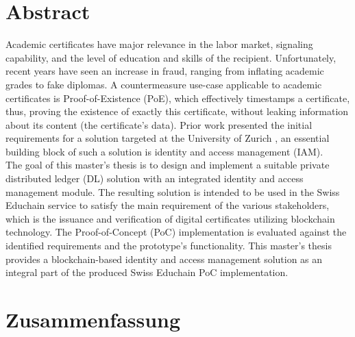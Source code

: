 \chapter*{Abstract}


Academic certificates have major relevance in the labor market, signaling capability, and the level of education and skills of the recipient. Unfortunately, recent years have seen an increase in fraud, ranging from inflating academic grades to fake diplomas. A countermeasure use-case applicable to academic certificates is Proof-of-Existence (PoE), which effectively timestamps a certificate, thus, proving the existence of exactly this certificate, without leaking information about its content (the certificate's data). Prior work presented the initial requirements for a solution targeted at the University of Zurich \cite{educhain-architecture}, an essential building block of such a solution is identity and access management (IAM). \\
The goal of this master's thesis is to design and implement a suitable private distributed ledger (DL) solution with an integrated identity and access management module. The resulting solution is intended to be used in the Swiss Educhain service \cite{educhain-proposal} to satisfy the main requirement of the various stakeholders, which is the issuance and verification of digital certificates utilizing blockchain technology. The Proof-of-Concept (PoC) implementation is evaluated against the identified requirements and the prototype's functionality. This master's thesis provides a blockchain-based identity and access management solution as an integral part of the produced Swiss Educhain PoC implementation.



\chapter*{Zusammenfassung}

